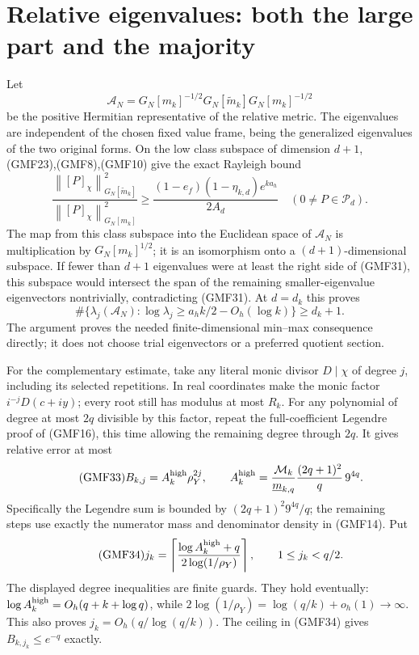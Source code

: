 \documentclass[11pt]{article}
\newcommand{\PP}{\mathcal P}
\newcommand{\norm}[1]{\left\lVert#1\right\rVert}
\begin{document}
\section{Relative eigenvalues: both the large part and the majority}

Let
\[
 \mathcal A_N=
 G_N[m_k]^{-1/2}G_N[\widetilde m_k]G_N[m_k]^{-1/2}
\]
be the positive Hermitian representative of the relative metric.
The eigenvalues are independent of the chosen fixed value frame,
being the generalized eigenvalues of the two original forms.
On the low class subspace of dimension \(d+1\),
(GMF23),(GMF8),(GMF10) give the exact Rayleigh bound
\begin{equation}\tag{GMF31}
 \frac{\norm{[P]_\chi}_{G_N[\widetilde m_k]}^2}
      {\norm{[P]_\chi}_{G_N[m_k]}^2}
 \ge
 \frac{(1-e_f)(1-\eta_{k,d})e^{ka_h}}{2A_d}
 \quad(0\ne P\in\PP_d).
\end{equation}
The map from this class subspace into the Euclidean space of
\(\mathcal A_N\) is multiplication by \(G_N[m_k]^{1/2}\);
it is an isomorphism onto a \((d+1)\)-dimensional subspace.
If fewer than \(d+1\) eigenvalues were at least the right
side of (GMF31), this subspace would intersect the span
of the remaining smaller-eigenvalue eigenvectors nontrivially,
contradicting (GMF31).
At \(d=d_k\) this proves
\begin{equation}\tag{GMF32}
 \#\{\lambda_j(\mathcal A_N):
 \log\lambda_j\ge a_hk/2-O_h(\log k)\}\ge d_k+1.
\end{equation}
The argument proves the needed finite-dimensional min--max
consequence directly; it does not choose trial eigenvectors
or a preferred quotient section.

For the complementary estimate, take any literal monic
divisor \(D\mid\chi\) of degree \(j\), including its selected
repetitions.  In real coordinates make the monic factor
\(i^{-j}D(c+iy)\); every root still has modulus at most \(R_k\).
For any polynomial of degree at most \(2q\) divisible by
this factor, repeat the full-coefficient Legendre proof of
(GMF16), this time allowing the remaining degree through
\(2q\).  It gives relative error at most
\begin{equation}\tag{GMF33}
 B_{k,j}=A_k^{\rm high}\rho_Y^{2j},\qquad
 A_k^{\rm high}=
 \frac{\mathcal M_k}{\underline m_{k,q}}
 \frac{(2q+1)^2}{q}\,9^{4q}.
\end{equation}
Specifically the Legendre sum is bounded by
\((2q+1)^2 9^{4q}/q\); the remaining steps use exactly
the numerator mass and denominator density in (GMF14).
Put
\begin{equation}\tag{GMF34}
 j_k=\left\lceil
 \frac{\log A_k^{\rm high}+q}{2\log(1/\rho_Y)}
 \right\rceil ,
 \qquad 1\le j_k<q/2.
\end{equation}
The displayed degree inequalities are finite guards.
They hold eventually: \(\log A_k^{\rm high}=O_h(q+k+\log q)\),
while
\(2\log(1/\rho_Y)=\log(q/k)+o_h(1)\to\infty\).
This also proves
\(j_k=O_h(q/\log(q/k))\).
The ceiling in (GMF34) gives \(B_{k,j_k}\le e^{-q}\) exactly.
\end{document}
